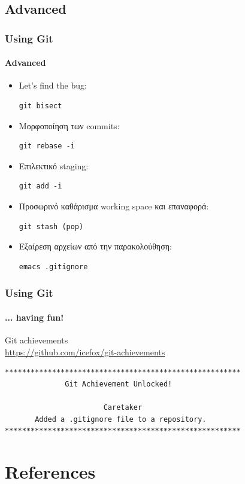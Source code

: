\documentclass[handout]{beamer}
\begin{document}
\subsection{Advanced}

\begin{frame}[fragile]
  \frametitle{Using Git}
  \framesubtitle{Advanced}
  \begin{itemize}
    \item Let's find the bug:
\begin{verbatim}
git bisect
\end{verbatim}\pause
    \item Μορφοποίηση των commits:
\begin{verbatim}
git rebase -i
\end{verbatim}\pause
    \item Επιλεκτικό staging:
\begin{verbatim}
git add -i
\end{verbatim}\pause
    \item Προσωρινό καθάρισμα working space και επαναφορά:
\begin{verbatim}
git stash (pop)
\end{verbatim}\pause
    \item Εξαίρεση αρχείων από την παρακολούθηση:
\begin{verbatim}
emacs .gitignore
\end{verbatim}
  \end{itemize}
\end{frame}

\begin{frame}[fragile]
  \frametitle{Using Git}
  \framesubtitle{... having fun!}
  \begin{center}
  Git achievements \\
  \url{https://github.com/icefox/git-achievements}
\begin{verbatim}
*******************************************************
              Git Achievement Unlocked!

                       Caretaker
       Added a .gitignore file to a repository.
*******************************************************
\end{verbatim}
  \end{center}
\end{frame}

\section*{References}
\end{document}
